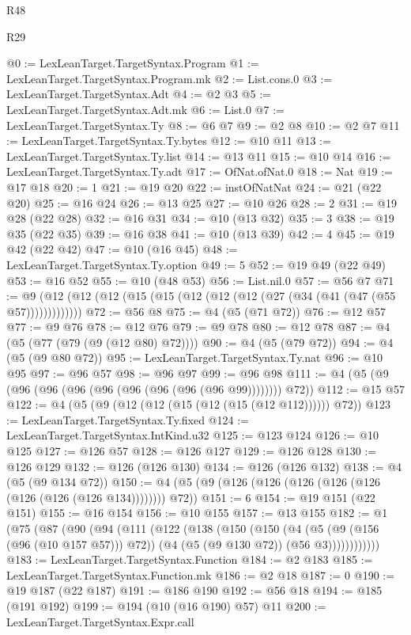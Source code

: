 \begin{lexlean}{R48}
\begin{lexlean}{R29}
\begin{coremodule}
{{{{{{{{{{{{{{{{{{{{{{{{{{{{{{{{{{{{{{{{{{{{{{{{{{{{{{{{{{{{{{{{{{{{{{{{{{{{{{{{{{{{{{{{{{{{{{{{{{{{{{{{{{{{{{{{{{{{{{{{{{{{{{{{{{{{{{{{{{{{{{{{{{{{{{{{{{{{{{{{{{{{{{{{{{{{{{{{{{{{{{{{{{{{{{{{{{{{{{{{{{{{{{{{{{{{{{{{{{@0 := LexLeanTarget.TargetSyntax.Program
@1 := LexLeanTarget.TargetSyntax.Program.mk
@2 := List.cons.{0}
@3 := LexLeanTarget.TargetSyntax.Adt
@4 := @2 @3
@5 := LexLeanTarget.TargetSyntax.Adt.mk
@6 := List.{0}
@7 := LexLeanTarget.TargetSyntax.Ty
@8 := @6 @7
@9 := @2 @8
@10 := @2 @7
@11 := LexLeanTarget.TargetSyntax.Ty.bytes
@12 := @10 @11
@13 := LexLeanTarget.TargetSyntax.Ty.list
@14 := @13 @11
@15 := @10 @14
@16 := LexLeanTarget.TargetSyntax.Ty.adt
@17 := OfNat.ofNat.{0}
@18 := Nat
@19 := @17 @18
@20 := 1
@21 := @19 @20
@22 := instOfNatNat
@24 := @21 (@22 @20)
@25 := @16 @24
@26 := @13 @25
@27 := @10 @26
@28 := 2
@31 := @19 @28 (@22 @28)
@32 := @16 @31
@34 := @10 (@13 @32)
@35 := 3
@38 := @19 @35 (@22 @35)
@39 := @16 @38
@41 := @10 (@13 @39)
@42 := 4
@45 := @19 @42 (@22 @42)
@47 := @10 (@16 @45)
@48 := LexLeanTarget.TargetSyntax.Ty.option
@49 := 5
@52 := @19 @49 (@22 @49)
@53 := @16 @52
@55 := @10 (@48 @53)
@56 := List.nil.{0}
@57 := @56 @7
@71 := @9 (@12 (@12 (@12 (@15 (@15 (@12 (@12 (@12 (@27 (@34 (@41 (@47 (@55 @57)))))))))))))
@72 := @56 @8
@75 := @4 (@5 (@71 @72))
@76 := @12 @57
@77 := @9 @76
@78 := @12 @76
@79 := @9 @78
@80 := @12 @78
@87 := @4 (@5 (@77 (@79 (@9 (@12 @80) @72))))
@90 := @4 (@5 (@79 @72))
@94 := @4 (@5 (@9 @80 @72))
@95 := LexLeanTarget.TargetSyntax.Ty.nat
@96 := @10 @95
@97 := @96 @57
@98 := @96 @97
@99 := @96 @98
@111 := @4 (@5 (@9 (@96 (@96 (@96 (@96 (@96 (@96 (@96 (@96 @99)))))))) @72))
@112 := @15 @57
@122 := @4 (@5 (@9 (@12 (@12 (@15 (@12 (@15 (@12 @112)))))) @72))
@123 := LexLeanTarget.TargetSyntax.Ty.fixed
@124 := LexLeanTarget.TargetSyntax.IntKind.u32
@125 := @123 @124
@126 := @10 @125
@127 := @126 @57
@128 := @126 @127
@129 := @126 @128
@130 := @126 @129
@132 := @126 (@126 @130)
@134 := @126 (@126 @132)
@138 := @4 (@5 (@9 @134 @72))
@150 := @4 (@5 (@9 (@126 (@126 (@126 (@126 (@126 (@126 (@126 (@126 @134)))))))) @72))
@151 := 6
@154 := @19 @151 (@22 @151)
@155 := @16 @154
@156 := @10 @155
@157 := @13 @155
@182 := @1
    (@75
      (@87
        (@90
          (@94
            (@111
              (@122
                (@138
                  (@150
                    (@150
                      (@4
                        (@5 (@9 (@156 (@96 (@10 @157 @57))) @72))
                        (@4 (@5 (@9 @130 @72)) (@56 @3))))))))))))
@183 := LexLeanTarget.TargetSyntax.Function
@184 := @2 @183
@185 := LexLeanTarget.TargetSyntax.Function.mk
@186 := @2 @18
@187 := 0
@190 := @19 @187 (@22 @187)
@191 := @186 @190
@192 := @56 @18
@194 := @185 (@191 @192)
@199 := @194 (@10 (@16 @190) @57) @11
@200 := LexLeanTarget.TargetSyntax.Expr.call
}}}}}}}}}}}}}}}}}}}}}}}}}}}}}}}}}}}}}}}}}}}}}}}}}}}}}}}}}}}}}}}}}}}}}}}}}}}}}}}}}}}}}}}}}}}}}}}}}}}}}}}}}}}}}}}}}}}}}}}}}}}}}}}}}}}}}}}}}}}}}}}}}}}}}}}}}}}}}}}}}}}}}}}}}}}}}}}}}}}}}}}}}}}}}}}}}}}}}}}}}}}}}}}}}}}}}}}}}}
\end{coremodule}
\end{lexlean}
\end{lexlean}
